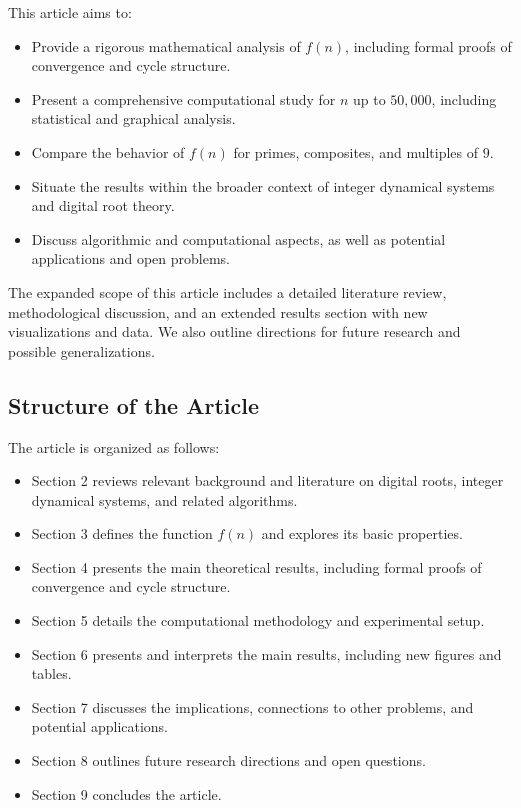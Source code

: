 \documentclass[12pt]{article}
\begin{document}
This article aims to:
\begin{itemize}
    \item Provide a rigorous mathematical analysis of $f(n)$, including formal proofs of convergence and cycle structure.
    \item Present a comprehensive computational study for $n$ up to $50,000$, including statistical and graphical analysis.
    \item Compare the behavior of $f(n)$ for primes, composites, and multiples of $9$.
    \item Situate the results within the broader context of integer dynamical systems and digital root theory.
    \item Discuss algorithmic and computational aspects, as well as potential applications and open problems.
\end{itemize}

The expanded scope of this article includes a detailed literature review, methodological discussion, and an extended results section with new visualizations and data. We also outline directions for future research and possible generalizations.

\subsection{Structure of the Article}
The article is organized as follows:
\begin{itemize}
    \item Section 2 reviews relevant background and literature on digital roots, integer dynamical systems, and related algorithms.
    \item Section 3 defines the function $f(n)$ and explores its basic properties.
    \item Section 4 presents the main theoretical results, including formal proofs of convergence and cycle structure.
    \item Section 5 details the computational methodology and experimental setup.
    \item Section 6 presents and interprets the main results, including new figures and tables.
    \item Section 7 discusses the implications, connections to other problems, and potential applications.
    \item Section 8 outlines future research directions and open questions.
    \item Section 9 concludes the article.
\end{itemize}
\end{document}
